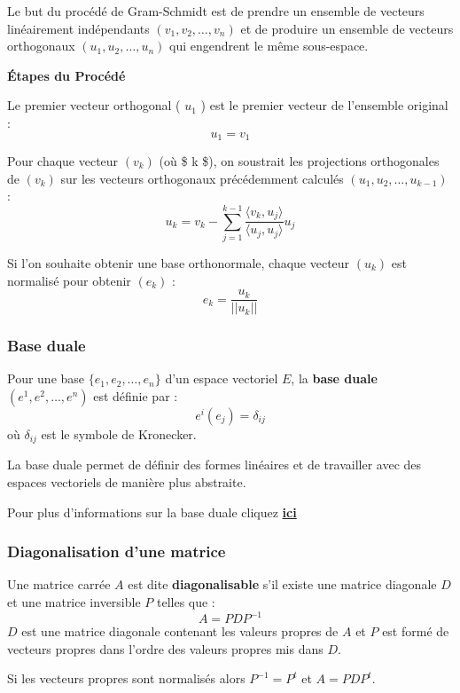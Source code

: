 \documentclass[
  letterpaper,
  DIV=11,
  numbers=noendperiod]{scrartcl}
\begin{document}
Le but du procédé de Gram-Schmidt est de prendre un ensemble de vecteurs
linéairement indépendants \(( {v_1, v_2, \ldots, v_n})\) et de produire
un ensemble de vecteurs orthogonaux \(( {u_1, u_2, \ldots, u_n} )\) qui
engendrent le même sous-espace.

\textbf{Étapes du Procédé}

Le premier vecteur orthogonal ( \(u_1\) ) est le premier vecteur de
l'ensemble original : \[u_1 = v_1\]

Pour chaque vecteur \(( v_k )\) (où \$ k  \$), on soustrait les
projections orthogonales de \(( v_k )\) sur les vecteurs orthogonaux
précédemment calculés \(( u_1, u_2, \ldots, u_{k-1})\) :
\[ u_k = v_k - \sum_{j=1}^{k-1} \frac{\langle v_k, u_j \rangle}{\langle u_j, u_j \rangle} u_j \]

Si l'on souhaite obtenir une base orthonormale, chaque vecteur
\(( u_k )\) est normalisé pour obtenir \(( e_k )\) :
\[ e_k = \frac{u_k}{||u_k||} \]

\subsubsection{Base duale}\label{base-duale}

Pour une base \(\{e_1, e_2, \ldots, e_n\}\) d'un espace vectoriel \(E\),
la \textbf{base duale} \((e^1, e^2, \ldots, e^n)\) est définie par :
\[e^i(e_j) = \delta_{ij}\] où \(\delta_{ij}\) est le symbole de
Kronecker.

La base duale permet de définir des formes linéaires et de travailler
avec des espaces vectoriels de manière plus abstraite.

Pour plus d'informations sur la base duale cliquez
\href{https://www.math.univ-paris13.fr/~schwartz/L2/dual.pdf}{\textbf{ici}}

\subsubsection{Diagonalisation d'une
matrice}\label{diagonalisation-dune-matrice}

Une matrice carrée \(A\) est dite \textbf{diagonalisable} s'il existe
une matrice diagonale \(D\) et une matrice inversible \(P\) telles que :
\[A = PDP^{-1}\] \(D\) est une matrice diagonale contenant les valeurs
propres de \(A\) et \(P\) est formé de vecteurs propres dans l'ordre des
valeurs propres mis dans \(D\).

\begin{tcolorbox}[enhanced jigsaw, opacityback=0, toptitle=1mm, bottomtitle=1mm, rightrule=.15mm, colframe=quarto-callout-tip-color-frame, leftrule=.75mm, titlerule=0mm, breakable, bottomrule=.15mm, colbacktitle=quarto-callout-tip-color!10!white, coltitle=black, arc=.35mm, left=2mm, colback=white, toprule=.15mm, title=\textcolor{quarto-callout-tip-color}{\faLightbulb}\hspace{0.5em}{Tip}, opacitybacktitle=0.6]

Si les vecteurs propres sont normalisés alors \(P^{-1} = P^t\) et
\(A = PDP^t\).

\end{tcolorbox}
\end{document}
